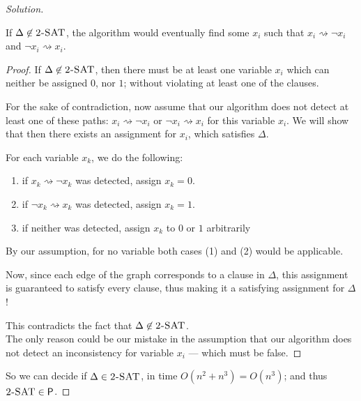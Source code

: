 \documentclass[usletter]{article}
\newcommand {\namedlangset}[1] {\ensuremath{\textnormal{\textsc{#1}}}}
\newcommand {\family}[1]       {\ensuremath{\mathsf{#1}}}
\newcommand {\PTime}  {\family{P}}
\begin{document}
\begin{enumerate}[labelsep=2.5em, label=\textbf{\arabic{enumi}}]
\begin{proof}[Solution]
    \begin{claim}[Completeness]
      If $\Delta \not\in \namedlangset{2-SAT}$, the algorithm would eventually
      find some $x_i$ such that $x_i \rightsquigarrow \neg x_i$ and
      $\neg x_i \rightsquigarrow x_i$.
    \end{claim}
    \begin{proof}
      If $\Delta \not\in \namedlangset{2-SAT}$, then there must be at least one
      variable $x_i$ which can neither be assigned $0$, nor $1$; without
      violating at least one of the clauses.

      For the sake of contradiction, now assume that our algorithm does not
      detect at least one of these paths: $x_i \rightsquigarrow \neg x_i$ or
      $\neg x_i \rightsquigarrow x_i$ for this variable $x_i$. We will show that
      then there exists an assignment for $x_i$, which satisfies $\Delta$.

      For each variable $x_k$, we do the following:
      \begin{enumerate}
        \item if $x_k \rightsquigarrow \neg x_k$ was detected, assign $x_k = 0$.
        \item if $\neg x_k \rightsquigarrow x_k$ was detected, assign $x_k = 1$.
        \item if neither was detected, assign $x_k$ to $0$ or $1$ arbitrarily
      \end{enumerate}
      By our assumption, for no variable both cases (1) and (2) would be
      applicable.

      Now, since each edge of the graph corresponds to a clause in $\Delta$,
      this assignment is guaranteed to satisfy every clause, thus making it a
      satisfying assignment for $\Delta$!

      This contradicts the fact that $\Delta \not\in \namedlangset{2-SAT}$. \\
      The only reason could be our mistake in the assumption that our algorithm
      does not detect an inconsistency for variable $x_i$ --- which must be
      false.
    \end{proof}

    So we can decide if $\Delta \in \namedlangset{2-SAT}$, in time
    $O(n^2 + n^3) = O(n^3)$; and thus $\namedlangset{2-SAT} \in \PTime$.
  \end{proof}



\end{enumerate}
\end{document}
